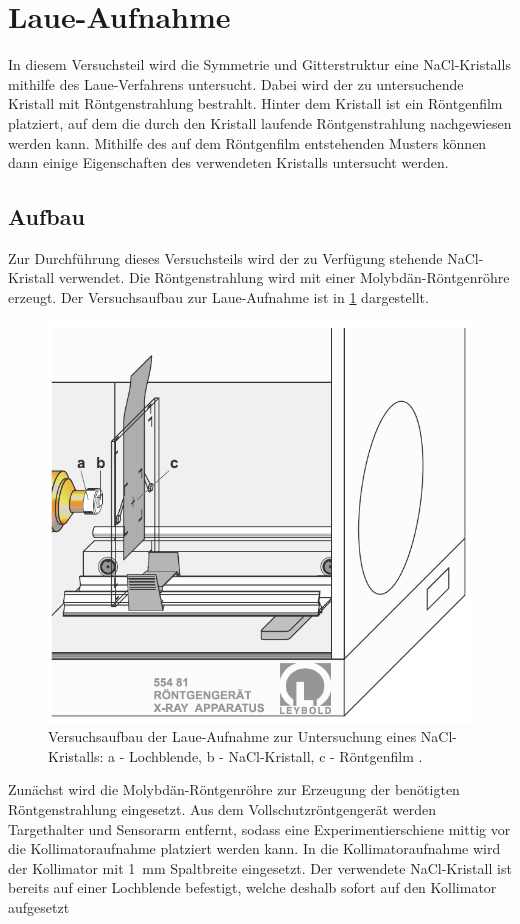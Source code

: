 \section{Laue-Aufnahme}\label{sec:laue}
In diesem Versuchsteil wird die Symmetrie und Gitterstruktur eine NaCl-Kristalls mithilfe des Laue-Verfahrens untersucht. Dabei wird der zu
untersuchende Kristall mit Röntgenstrahlung bestrahlt. Hinter dem Kristall ist ein Röntgenfilm platziert, auf dem die durch den Kristall laufende
Röntgenstrahlung nachgewiesen werden kann. Mithilfe des auf dem Röntgenfilm entstehenden Musters können dann einige Eigenschaften des verwendeten
Kristalls untersucht werden.
\subsection{Aufbau}\label{subsec:laue_aufbau}
Zur Durchführung dieses Versuchsteils wird der zu Verfügung stehende NaCl-Kristall verwendet. Die Röntgenstrahlung wird mit einer Molybdän-Röntgenröhre
erzeugt. Der Versuchsaufbau zur Laue-Aufnahme ist in \cref{fig:aufbau_laue} dargestellt.
\begin{figure}[H]
	\centering
	\includegraphics[width=0.6\linewidth]{../figs/aufbau_laue.png}
	\caption{Versuchsaufbau der Laue-Aufnahme zur Untersuchung eines NaCl-Kristalls:
    a - Lochblende, b - NaCl-Kristall, c - Röntgenfilm  \cite{laue_handblatt}.}
	\label{fig:aufbau_laue}
\end{figure} Zunächst wird die Molybdän-Röntgenröhre zur Erzeugung der benötigten Röntgenstrahlung eingesetzt. Aus dem Vollschutzröntgengerät werden Targethalter
und Sensorarm entfernt, sodass eine Experimentierschiene mittig vor die Kollimatoraufnahme platziert werden kann. In die Kollimatoraufnahme wird der Kollimator
mit \SI{1}{\milli \meter} Spaltbreite eingesetzt. Der verwendete NaCl-Kristall ist bereits auf einer Lochblende befestigt, welche deshalb sofort auf den Kollimator aufgesetzt
